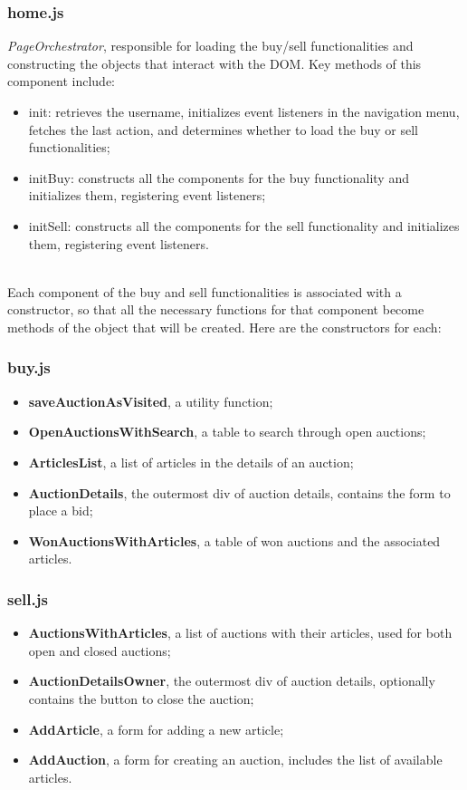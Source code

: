 \documentclass[12pt, a4paper, renqo, final]{amsart}
\begin{document}
				\subsubsection{home.js}
					\textit{PageOrchestrator}, responsible for loading the buy/sell functionalities and constructing the objects that interact with the DOM. Key methods of this component include:
					\begin{itemize}
						\item init: retrieves the username, initializes event listeners in the navigation menu, fetches the last action, and determines whether to load the buy or sell functionalities;
						\item initBuy: constructs all the components for the buy functionality and initializes them, registering event listeners;
						\item initSell: constructs all the components for the sell functionality and initializes them, registering event listeners.
					\end{itemize}
				\phantom{.}\\
				Each component of the buy and sell functionalities is associated with a constructor, so that all the necessary functions for that component become methods of the object that will be created. Here are the constructors for each:

				\subsubsection{buy.js}
					\begin{itemize}
						\item \textbf{saveAuctionAsVisited}, a utility function;
						\item \textbf{OpenAuctionsWithSearch}, a table to search through open auctions;
						\item \textbf{ArticlesList}, a list of articles in the details of an auction;
						\item \textbf{AuctionDetails}, the outermost div of auction details, contains the form to place a bid;
						\item \textbf{WonAuctionsWithArticles}, a table of won auctions and the associated articles.
					\end{itemize}

				\subsubsection{sell.js}
					\begin{itemize}
						\item \textbf{AuctionsWithArticles}, a list of auctions with their articles, used for both open and closed auctions;
						\item \textbf{AuctionDetailsOwner}, the outermost div of auction details, optionally contains the button to close the auction;
						\item \textbf{AddArticle}, a form for adding a new article;
						\item \textbf{AddAuction}, a form for creating an auction, includes the list of available articles.
					\end{itemize}
\end{document}
